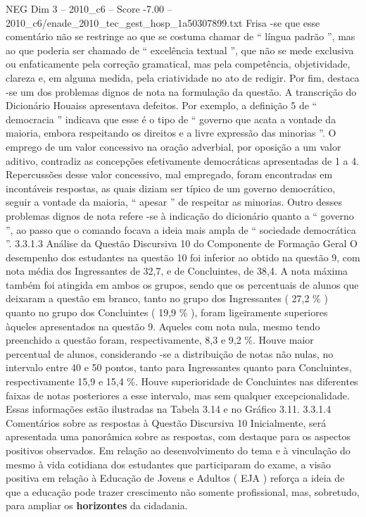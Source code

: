 \begin{textsample}{NEG Dim 3 – 2010\_c6 – Score -7.00 – 2010\_c6/enade\_2010\_tec\_gest\_hosp\_1a50307899.txt}
Frisa -se que esse comentário não se restringe ao que se costuma chamar de “ língua padrão ”, mas ao que poderia ser chamado de “ excelência textual ”, que não se mede exclusiva ou enfaticamente pela correção gramatical, mas pela competência, objetividade, clareza e, em alguma medida, pela criatividade no ato de redigir.
Por fim, destaca -se um dos problemas dignos de nota na formulação da questão.
A transcrição do Dicionário Houaiss apresentava defeitos.
Por exemplo, a definição 5 de “ democracia ” indicava que esse é o tipo de “ governo que acata a vontade da maioria, embora respeitando os direitos e a livre expressão das minorias ”.
O emprego de um valor concessivo na oração adverbial, por oposição a um valor aditivo, contradiz as concepções efetivamente democráticas apresentadas de 1 a 4.
Repercussões desse valor concessivo, mal empregado, foram encontradas em incontáveis respostas, as quais diziam ser típico de um governo democrático, seguir a vontade da maioria, “ apesar ” de respeitar as minorias.
Outro desses problemas dignos de nota refere -se à indicação do dicionário quanto a “ governo ”, ao passo que o comando focava a ideia mais ampla de “ sociedade democrática ”. 3.3.1.3 Análise da Questão Discursiva 10 do Componente de Formação Geral O desempenho dos estudantes na questão 10 foi inferior ao obtido na questão 9, com nota média dos Ingressantes de 32,7, e de Concluintes, de 38,4.
A nota máxima também foi atingida em ambos os grupos, sendo que os percentuais de alunos que deixaram a questão em branco, tanto no grupo dos Ingressantes ( 27,2 \% ) quanto no grupo dos Concluintes ( 19,9 \% ), foram ligeiramente superiores àqueles apresentados na questão 9.
Aqueles com nota nula, mesmo tendo preenchido a questão foram, respectivamente, 8,3 e 9,2 \%.
Houve maior percentual de alunos, considerando -se a distribuição de notas não nulas, no intervalo entre 40 e 50 pontos, tanto para Ingressantes quanto para Concluintes, respectivamente 15,9 e 15,4 \%.
Houve superioridade de Concluintes nas diferentes faixas de notas posteriores a esse intervalo, mas sem qualquer excepcionalidade.
Essas informações estão ilustradas na Tabela 3.14 e no Gráfico 3.11. 3.3.1.4 Comentários sobre as respostas à Questão Discursiva 10 Inicialmente, será apresentada uma panorâmica sobre as respostas, com destaque para os aspectos positivos observados.
Em relação ao desenvolvimento do tema e à vinculação do mesmo à vida cotidiana dos estudantes que participaram do exame, a visão positiva em relação à Educação de Jovens e Adultos ( EJA ) reforça a ideia de que a educação pode trazer crescimento não somente profissional, mas, sobretudo, para ampliar os \textbf{horizontes} da cidadania.

\end{textsample}
